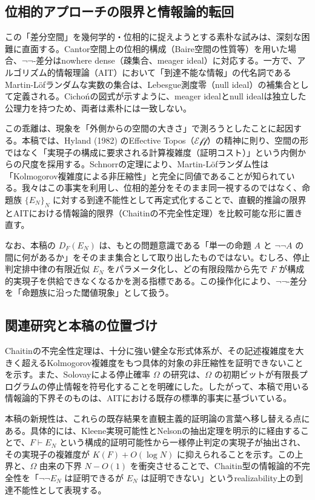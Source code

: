 \documentclass[a4paper,11pt]{ltjsarticle}
\theoremstyle{plain}
\begin{document}
\subsection{位相的アプローチの限界と情報論的転回}

この「差分空間」を幾何学的・位相的に捉えようとする素朴な試みは、深刻な困難に直面する。Cantor空間上の位相的構成（Baire空間の性質等）を用いた場合、$\neg\neg$-差分はnowhere dense（疎集合、meager ideal）に対応する。一方で、アルゴリズム的情報理論（AIT）において「到達不能な情報」の代名詞であるMartin-Löfランダムな実数の集合は、Lebesgue測度零（null ideal）の補集合として定義される。Cichońの図式が示すように、meager idealとnull idealは独立した公理力を持つため、両者は素朴には一致しない。

この乖離は、現象を「外側からの空間の大きさ」で測ろうとしたことに起因する。本稿では、Hyland (1982) のEffective Topos（$\mathcal{Eff}$）の精神に則り、空間の形ではなく「実現子の構成に要求される計算複雑度（証明コスト）」という内側からの尺度を採用する。Schnorrの定理により、Martin-Löfランダム性は「Kolmogorov複雑度による非圧縮性」と完全に同値であることが知られている。我々はこの事実を利用し、位相的差分をそのまま同一視するのではなく、命題族 $\{E_N\}_N$ に対する到達不能性として再定式化することで、直観的推論の限界とAITにおける情報論的限界（Chaitinの不完全性定理）を比較可能な形に置き直す。

なお、本稿の $D_F(E_N)$ は、もとの問題意識である「単一の命題 $A$ と $\neg\neg A$ の間に何があるか」をそのまま集合として取り出したものではない。むしろ、停止判定排中律の有限近似 $E_N$ をパラメータ化し、どの有限段階から先で $F$ が構成的実現子を供給できなくなるかを測る指標である。この操作化により、$\neg\neg$-差分を「命題族に沿った閾値現象」として扱う。

\subsection{関連研究と本稿の位置づけ}

Chaitinの不完全性定理は、十分に強い健全な形式体系が、その記述複雑度を大きく超えるKolmogorov複雑度をもつ具体的対象の非圧縮性を証明できないことを示す。また、Solovayによる停止確率 $\Omega$ の研究は、$\Omega$ の初期ビットが有限長プログラムの停止情報を符号化することを明確にした。したがって、本稿で用いる情報論的下界そのものは、AITにおける既存の標準的事実に基づいている。

本稿の新規性は、これらの既存結果を直観主義的証明論の言葉へ移し替える点にある。具体的には、Kleene実現可能性とNelsonの抽出定理を明示的に経由することで、$F \vdash E_N$ という構成的証明可能性から一様停止判定の実現子が抽出され、その実現子の複雑度が $K(F)+O(\log N)$ に抑えられることを示す。この上界と、$\Omega$ 由来の下界 $N-O(1)$ を衝突させることで、Chaitin型の情報論的不完全性を「$\neg\neg E_N$ は証明できるが $E_N$ は証明できない」というrealizability上の到達不能性として表現する。
\end{document}
